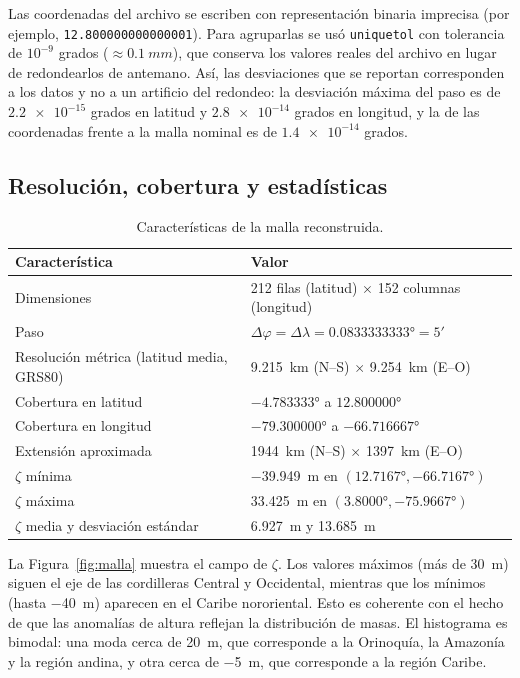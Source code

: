 \documentclass[11pt,letterpaper]{article}
\begin{document}
Las coordenadas del archivo se escriben con representación binaria imprecisa (por ejemplo,
\texttt{12.800000000000001}). Para agruparlas se usó \texttt{uniquetol} con tolerancia de
$10^{-9}$ grados ($\approx\SI{0.1}{mm}$), que conserva los valores reales del archivo en
lugar de redondearlos de antemano. Así, las desviaciones que se reportan corresponden a los
datos y no a un artificio del redondeo: la desviación máxima del paso es de
$\num{2.2e-15}$ grados en latitud y $\num{2.8e-14}$ grados en longitud, y la de las
coordenadas frente a la malla nominal es de $\num{1.4e-14}$ grados.

\subsection{Resolución, cobertura y estadísticas}
\begin{table}[H]
\centering
\caption{Características de la malla reconstruida.}
\label{tab:malla}
\begin{tabular}{@{}ll@{}}
\toprule
Característica & Valor \\
\midrule
Dimensiones & 212 filas (latitud) $\times$ 152 columnas (longitud) \\
Paso & $\Delta\varphi=\Delta\lambda=\ang{0.0833333333}=5'$ \\
Resolución métrica (latitud media, GRS80) & \SI{9.215}{km} (N--S) $\times$ \SI{9.254}{km} (E--O) \\
Cobertura en latitud & $\ang{-4.783333}$ a $\ang{12.800000}$ \\
Cobertura en longitud & $\ang{-79.300000}$ a $\ang{-66.716667}$ \\
Extensión aproximada & \SI{1944}{km} (N--S) $\times$ \SI{1397}{km} (E--O) \\
$\zeta$ mínima & \SI{-39.949}{m} en $(\ang{12.7167},\ang{-66.7167})$ \\
$\zeta$ máxima & \SI{33.425}{m} en $(\ang{3.8000},\ang{-75.9667})$ \\
$\zeta$ media y desviación estándar & \SI{6.927}{m} y \SI{13.685}{m} \\
\bottomrule
\end{tabular}
\end{table}

La Figura~\ref{fig:malla} muestra el campo de $\zeta$. Los valores máximos (más de
\SI{30}{m}) siguen el eje de las cordilleras Central y Occidental, mientras que los
mínimos (hasta \SI{-40}{m}) aparecen en el Caribe nororiental. Esto es coherente con
el hecho de que las anomalías de altura reflejan la distribución de masas. El histograma
es bimodal: una moda cerca de \SI{20}{m}, que corresponde a la Orinoquía, la Amazonía y la
región andina, y otra cerca de \SI{-5}{m}, que corresponde a la región Caribe.
\end{document}
